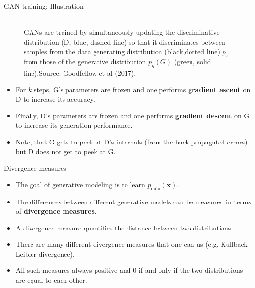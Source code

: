 \begin{frame} {GAN training: Illustration}
\begin{figure}
\centering
{}
\tiny{\\GANs are trained by simultaneously updating the discriminative distribution
(D, blue, dashed line) so that it discriminates between samples from the data generating distribution (black,dotted line) $p_x$ from those of the generative distribution $p_g (G)$ (green, solid line).Source: Goodfellow et al (2017),}
\end{figure}
\begin{itemize}
\item For $k$ steps, G's parameters are frozen and one performs \textbf{gradient ascent} on D to increase its accuracy.
\item Finally, D's parameters are frozen and one performs \textbf{gradient descent} on G to increase its generation performance. %
\item Note, that G gets to peek at D's internals (from the back-propagated errors) but D  does not get to peek at G.
\end{itemize}
\end{frame}

\begin{frame} {Divergence measures}
  \begin{itemize}
    \item The goal of generative modeling is to learn $p_{\text{data}}(\mathbf{x})$.
    \vspace{2mm}
    \item The differences between different generative models can be measured in terms of \textbf{divergence measures}.
    \vspace{2mm}
    \item A divergence measure quantifies the distance between two distributions. %
    \vspace{2mm}
    \item There are many different divergence measures that one can us (e.g. Kullback-Leibler divergence).
    \vspace{2mm}
    \item All such measures always  positive and  0 if and only if the two distributions are equal to each other.
  \end{itemize}
\end{frame}


